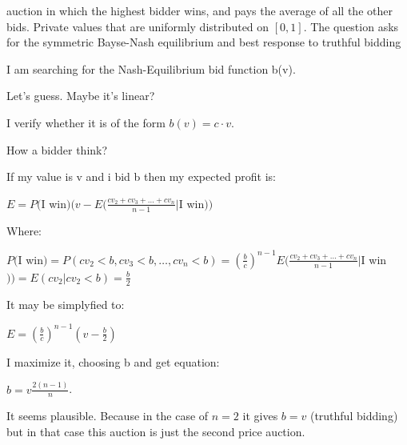 \begin{problem}

auction in which the highest bidder wins, and pays the average of all the other bids. Private values that are uniformly distributed on $[0,1]$. The question asks for the symmetric Bayse-Nash equilibrium and best response to truthful bidding



\begin{sol}

I am searching for the Nash-Equilibrium bid function b(v).

Let's guess. Maybe it's linear? \par
I verify whether it is of the form $b(v) = c\cdot v$. \par
How a bidder think? \par

If my value is v and i bid b then my expected profit is:\par
$E = P($I win$)(v - E(\frac {cv_{2} + cv_{3} + \ldots + cv_{n}}{n - 1}|$I win$))$ \par
Where:\par
$P($I win$)=P(cv_{2} < b,cv_{3} < b,\ldots ,cv_{n} < b)=\left(\frac {b}{c}\right)^{n - 1}
E(\frac {cv_{2} + cv_{3} + \ldots + cv_{n}}{n - 1}|$I win$))=E(cv_{2}|cv_{2}<b)=\frac{b}{2}$\par
It may be simplyfied to:\par
$E = \left(\frac {b}{c}\right)^{n - 1}(v - \frac {b}{2})$\par
I maximize it, choosing b and get equation: \par
$b = v\frac {2(n - 1)}{n}$. \par

It seems plausible. Because in the case of $n = 2$ it gives $b = v$ (truthful bidding) but in that case this auction is just the second price auction.
\end{sol}
\end{problem}



